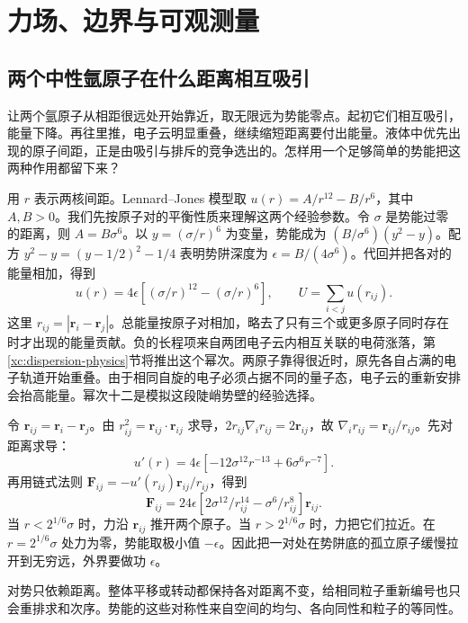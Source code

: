 \chapter{力场、边界与可观测量}
\section{两个中性氩原子在什么距离相互吸引}
让两个氩原子从相距很远处开始靠近，取无限远为势能零点。起初它们相互吸引，能量下降。再往里推，电子云明显重叠，继续缩短距离要付出能量。液体中优先出现的原子间距，正是由吸引与排斥的竞争选出的。怎样用一个足够简单的势能把这两种作用都留下来？

用 $r$ 表示两核间距。Lennard--Jones 模型取 $u(r)=A/r^{12}-B/r^6$，其中 $A,B>0$。我们先按原子对的平衡性质来理解这两个经验参数。令 $\sigma$ 是势能过零的距离，则 $A=B\sigma^6$。以 $y=(\sigma/r)^6$ 为变量，势能成为 $(B/\sigma^6)(y^2-y)$。配方 $y^2-y=(y-1/2)^2-1/4$ 表明势阱深度为 $\epsilon=B/(4\sigma^6)$。代回并把各对的能量相加，得到
\begin{equation}
u(r)=4\epsilon[(\sigma/r)^{12}-(\sigma/r)^6],\qquad U=\sum_{i<j}u(r_{ij}).
\end{equation}
这里 $r_{ij}=|\bm r_i-\bm r_j|$。总能量按原子对相加，略去了只有三个或更多原子同时存在时才出现的能量贡献。负的长程项来自两团电子云内相互关联的电荷涨落，第\ref{xc:dispersion-physics}节将推出这个幂次。两原子靠得很近时，原先各自占满的电子轨道开始重叠。由于相同自旋的电子必须占据不同的量子态，电子云的重新安排会抬高能量。幂次十二是模拟这段陡峭势壁的经验选择。

令 $\bm r_{ij}=\bm r_i-\bm r_j$。由 $r_{ij}^2=\bm r_{ij}\cdot\bm r_{ij}$ 求导，$2r_{ij}\nabla_i r_{ij}=2\bm r_{ij}$，故 $\nabla_i r_{ij}=\bm r_{ij}/r_{ij}$。先对距离求导：
\begin{equation}
u'(r)=4\epsilon[-12\sigma^{12}r^{-13}+6\sigma^6r^{-7}].
\end{equation}
再用链式法则 $\bm F_{ij}=-u'(r_{ij})\bm r_{ij}/r_{ij}$，得到
\begin{equation}
\bm F_{ij}=24\epsilon[2\sigma^{12}/r_{ij}^{14}-\sigma^6/r_{ij}^8]\bm r_{ij}.
\end{equation}
当 $r<2^{1/6}\sigma$ 时，力沿 $\bm r_{ij}$ 推开两个原子。当 $r>2^{1/6}\sigma$ 时，力把它们拉近。在 $r=2^{1/6}\sigma$ 处力为零，势能取极小值 $-\epsilon$。因此把一对处在势阱底的孤立原子缓慢拉开到无穷远，外界要做功 $\epsilon$。

对势只依赖距离。整体平移或转动都保持各对距离不变，给相同粒子重新编号也只会重排求和次序。势能的这些对称性来自空间的均匀、各向同性和粒子的等同性。

